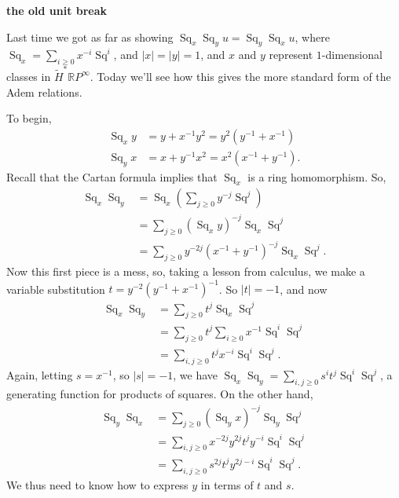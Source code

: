 \documentclass{article}
\newcommand{\R}{\mathbb{R}}
\newcommand{\RP}{\R P}
\DeclareMathOperator{\Sq}{Sq}
\theoremstyle{definition}
\begin{document}
\textbf{the old unit break}

Last time we got as far as showing $\Sq_x \Sq_y u = \Sq_y \Sq_x u$, where $\Sq_x = \sum_{i \ge 0} x^{-i} \Sq^i$, and $|x| = |y| = 1$, and $x$ and $y$ represent $1$-dimensional classes in $\widetilde H^* \RP^\infty$. %
Today we'll see how this gives the more standard form of the Adem relations.

To begin,
\begin{align*}
\Sq_x y & = y + x^{-1} y^2 = y^2(y^{-1} + x^{-1}) \\
\Sq_y x & = x + y^{-1} x^2 = x^2(x^{-1} + y^{-1}).
\end{align*}
Recall that the Cartan formula implies that $\Sq_x$ is a ring homomorphism.  So,
\begin{align*}
\Sq_x \Sq_y & = \Sq_x \left( \sum_{j \ge 0} y^{-j} \Sq^j \right) \\
& = \sum_{j \ge 0}(\Sq_x y)^{-j} \Sq_x \Sq^j \\
& = \sum_{j \ge 0} y^{-2j}(x^{-1} + y^{-1})^{-j} \Sq_x \Sq^j.
\end{align*}
Now this first piece is a mess, so, taking a lesson from calculus, we make a variable substitution $t = y^{-2}(y^{-1} + x^{-1})^{-1}$.  So $|t| = -1$, and now
\begin{align*}
\Sq_x \Sq_y & = \sum_{j \ge 0} t^j \Sq_x \Sq^j \\
& = \sum_{j \ge 0} t^j \sum_{i \ge 0} x^{-1} \Sq^i \Sq^j \\
& = \sum_{i, j \ge 0} t^j x^{-i} \Sq^i \Sq^j.
\end{align*}
Again, letting $s = x^{-1}$, so $|s| = -1$, we have $\Sq_x \Sq_y = \sum_{i, j \ge 0} s^i t^j \Sq^i \Sq^j$, a generating function for products of squares.  On the other hand,
\begin{align*}
\Sq_y \Sq_x & = \sum_{j \ge 0}(\Sq_y x)^{-j} \Sq_y \Sq^j \\
& = \sum_{i, j \ge 0} x^{-2j} y^{2j} t^j y^{-i} \Sq^i \Sq^j \\
& = \sum_{i, j \ge 0} s^{2j} t^j y^{2j-i} \Sq^i \Sq^j.
\end{align*}
We thus need to know how to express $y$ in terms of $t$ and $s$.
\end{document}
